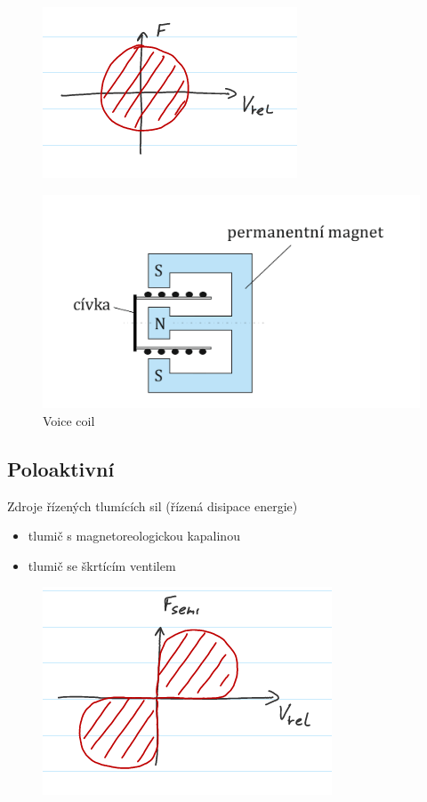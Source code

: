 \documentclass{article}
\begin{document}
	\begin{figure}[h!]
		\centering
		\includegraphics{figs/AktivniAktuator.png}
	\end{figure}
	\begin{figure}[h!]
		\centering
		\includegraphics[width=0.5\linewidth]{figs/VoiceCoil.png}
		\caption{Voice coil}
	\end{figure}

	\subsection{Poloaktivní}
	Zdroje řízených tlumících sil (řízená disipace energie)
	\begin{itemize}
	\item tlumič s magnetoreologickou kapalinou
	\item tlumič se škrtícím ventilem
	\end{itemize}

	\begin{figure}[h!]
		\centering
		\includegraphics{figs/PoloAktivniAktuator.png}
	\end{figure}
\end{document}
